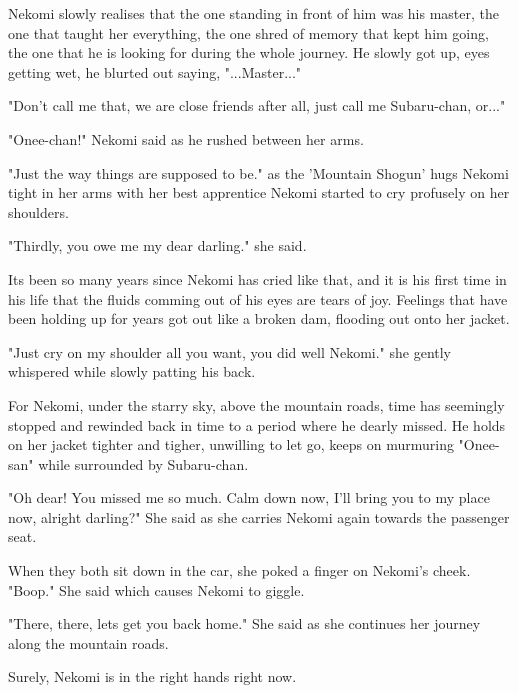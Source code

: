 Nekomi slowly realises that the one standing in front of him was his master, the one that taught her everything, the one shred of memory that kept him going, the one that he is looking for during the whole journey. He slowly got up, eyes getting wet, he blurted out saying, "...Master..."

"Don't call me that, we are close friends after all, just call me Subaru-chan, or..."

"Onee-chan!" Nekomi said as he rushed between her arms.

"Just the way things are supposed to be." as the 'Mountain Shogun' hugs Nekomi tight in her arms with her best apprentice Nekomi started to cry profusely on her shoulders.

"Thirdly, you owe me my dear darling." she said.

Its been so many years since Nekomi has cried like that, and it is his first time in his life that the fluids comming out of his eyes are tears of joy. Feelings that have been holding up for years got out like a broken dam, flooding out onto her jacket.

"Just cry on my shoulder all you want, you did well Nekomi." she gently whispered while slowly patting his back.

For Nekomi, under the starry sky, above the mountain roads, time has seemingly stopped and rewinded back in time to a period where he dearly missed. He holds on her jacket tighter and tigher, unwilling to let go, keeps on murmuring "Onee-san" while surrounded by Subaru-chan.

"Oh dear! You missed me so much. Calm down now, I'll bring you to my place now, alright darling?" She said as she carries Nekomi again towards the passenger seat.

When they both sit down in the car, she poked a finger on Nekomi's cheek. "Boop." She said which causes Nekomi to giggle.

"There, there, lets get you back home." She said as she continues her journey along the mountain roads.

Surely, Nekomi is in the right hands right now.